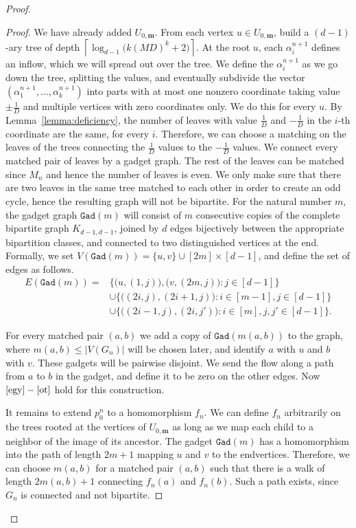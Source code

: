 \documentclass[10pt]{article}
\theoremstyle{plain}
\theoremstyle{remark}
\newcommand{\1}{\mathbbm{1}}
\numberwithin{equation}{section}
\begin{document}
\begin{proof}
\begin{proof}
We have already added $U_{0,\mathbf{m}}$. From each vertex $u\in U_{0,\mathbf{m}}$, build a $(d-1)$-ary tree of depth $\left\lceil \log_{d-1}\big(k(MD)^k +2 \big)\right\rceil$. At the root $u$, each $\alpha^{n+1}_{i}$ defines an inflow, which we will spread out over the tree. We define the $\alpha_i^{n+1}$ as we go down the tree, splitting the values, and eventually subdivide the  vector $(\alpha_1^{n+1}, \ldots, \alpha^{n+1}_k)$ into parts with at most one nonzero coordinate taking value $\pm \frac{1}{D}$ and multiple vertices with zero coordinates only. We do this for every $u$. By Lemma~\ref{lemma:deficiency}, the number of leaves with value $\frac{1}{D}$ and $-\frac{1}{D}$ in the $i$-th coordinate are the same, for every $i$. Therefore, we can choose a matching on the leaves of the trees connecting the $\frac{1}{D}$ values to the $-\frac{1}{D}$ values. We connect every matched pair of leaves by a gadget graph. The rest of the leaves can be matched since $M_n$ and hence the number of leaves is even. We only make sure that there are two leaves in the same tree matched to each other in order to create an odd cycle, hence the resulting graph will not be bipartite. For the natural number $m$, the gadget graph $\texttt{Gad}(m)$ will consist of $m$ consecutive copies of the complete bipartite graph $K_{d-1,d-1}$, joined by $d$ edges bijectively between the appropriate bipartition classes, and connected to two distinguished vertices at the end. Formally, we set $V(\texttt{Gad}(m))=\{u,v\} \cup [2m] \times [d-1]$, and define the set of edges as follows. 
\begin{align*}
    E(\texttt{Gad}(m))=&\bigg\{\big(u,(1,j) \big), \big( v,(2m,j) \big): j \in [d-1] \bigg\} \\
&\cup \bigg\{\big( (2i,j),(2i+1,j) \big): i \in [m-1], j \in [d-1] \bigg\}\\
 &\cup\bigg\{\big( (2i-1,j),(2i,j') \big): i \in [m], j, j' \in [d-1] \bigg\}.
 \end{align*}

For every matched pair $(a,b) $ we add a copy of $\texttt{Gad}(m(a,b))$ to the graph, where $m(a,b)\leq |V(G_n)|$ will be chosen later, and identify $a$ with $u$ and $b$ with $v$. These gadgets will be pairwise disjoint. We send the flow along a path from $a$ to $b$ in the gadget, and define it to be zero on the other edges. Now $\ref{egy}-\ref{ot}$  hold for this construction. 

It remains to extend $p_0^n$ to a homomorphism $f_n$. We can define $f_n$ arbitrarily on the trees rooted at the vertices of $U_{0,\mathbf{m}}$ as long as we map each child to a neighbor of the image of its ancestor. The gadget $\texttt{Gad}(m)$ has a homomorphism into the path of length $2m+1$ mapping $u$ and $v$ to the endvertices. Therefore, we can choose $m(a,b)$ for a matched pair $(a,b)$ such that there is a walk of length $2m(a,b)+1$ connecting $f_{n}(a)$ and $f_n(b)$. Such a path exists, since $G_n$ is connected and not bipartite.
\end{proof}



\end{proof}
\end{document}
